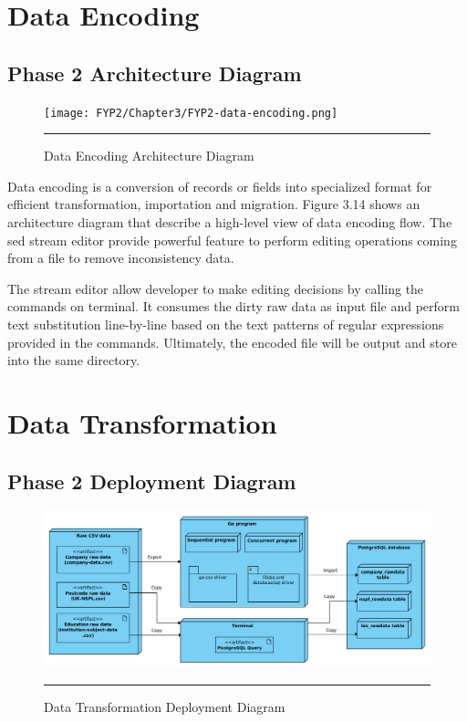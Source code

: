 \begin{enumerate}[topsep=0pt,itemsep=-1ex,partopsep=1ex,parsep=1.5ex]
\end{enumerate}

\section{Data Encoding}

\subsection{Phase 2 Architecture Diagram}

\begin{figure}[H]
	\centering
	\texttt{[image: FYP2/Chapter3/FYP2-data-encoding.png]}
	\rule{35em}{0.5pt}
	\caption[Data Encoding Architecture Diagram]{Data Encoding Architecture Diagram}
\end{figure} 

Data encoding is a conversion of records or fields into specialized format for efficient transformation, importation and migration. \cite{data-encoding-definition} Figure 3.14 shows an architecture diagram that describe a high-level view of data encoding flow. The sed stream editor provide powerful feature to perform editing operations coming from a file to remove inconsistency data. \cite{sed-usage} 

The stream editor allow developer to make editing decisions by calling the commands on terminal. It consumes the dirty raw data as input file and perform text substitution line-by-line based on the text patterns of regular expressions provided in the commands. Ultimately, the encoded file will be output and store into the same directory. 

\section{Data Transformation}

\subsection{Phase 2 Deployment Diagram}

\begin{figure}[H]
	\centering
	\includegraphics[width=1.0\textwidth]{FYP2/Chapter3/FYP2-data-transformation-deployment.png}
	\rule{35em}{0.5pt}
	\caption[Data Transformation Deployment Diagram]{Data Transformation Deployment Diagram}
\end{figure} 


